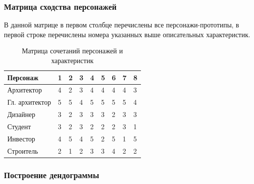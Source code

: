 \documentclass[a4paper,14pt]{extreport} %
\begin{document}
\newpage
\subsubsection{Матрица сходства персонажей}

В данной матрице в первом столбце перечислены все персонажи-прототипы, в первой строке перечислены номера  указанных выше описательных характеристик.

\begin{table}[H]
\caption {Матрица  сочетаний персонажей и характеристик} \label{tab:title}
\begin{center}
\begin{tabular}{| p{4cm}  | p{1cm} | p{1cm} | p{1cm} | p{1cm} | p{1cm} | p{1cm} | p{1cm} | p{1cm} |}
\hline
\textbf{Персонаж} & \textbf{1} & \textbf{2} & \textbf{3} & \textbf{4} & \textbf{5} & \textbf{6} & \textbf{7} & \textbf{8} \\
\hline
Архитектор 		& 4 & 2 & 3 & 4 & 4 & 4 & 4 & 3 \\
\hline
Гл. архитектор	& 5 & 5 & 4 & 5 & 5 & 5 & 5 & 4 \\
\hline
Дизайнер			& 3 & 2 & 3 & 3 & 3 & 2 & 3 & 3 \\
\hline
Студент			& 3 & 2 & 3 & 2 & 2 & 2 & 3 & 1 \\
\hline
Инвестор			& 4 & 5 & 4 & 5 & 2 & 5 & 1 & 5 \\
\hline
Строитель		& 2 & 1 & 2 & 3 & 3 & 4 & 2 & 2 \\
\hline
\end{tabular}
\end{center}
\end{table}

\subsubsection{Построение дендограммы}
\end{document}
